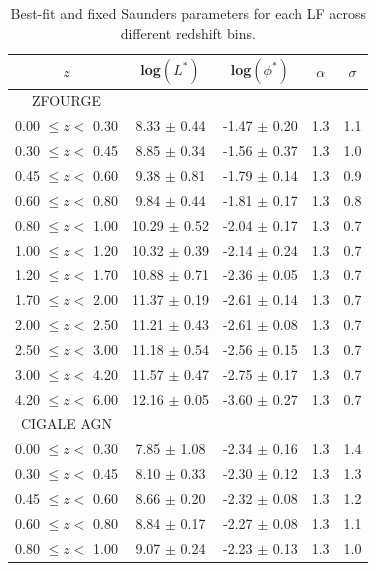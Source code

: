 \begin{table}[h]
    \caption{Best-fit and fixed Saunders parameters for each LF across different redshift bins.}
    \label{Tab: Param Evo}
    \begin{center}
    \begin{tabular}{ccccc}
        \toprule
        $z$ & log$(L^{*})$ & log$(\phi^{*})$ & $\alpha$ & $\sigma$ \\
        \hline
        ZFOURGE \\
        \hline
        0.00 $\leq z <$ 0.30 &  8.33 $\pm$ 0.44 & -1.47 $\pm$ 0.20 & 1.3 & 1.1 \\
        0.30 $\leq z <$ 0.45 &  8.85 $\pm$ 0.34 & -1.56 $\pm$ 0.37 & 1.3 & 1.0 \\
        0.45 $\leq z <$ 0.60 &  9.38 $\pm$ 0.81 & -1.79 $\pm$ 0.14 & 1.3 & 0.9 \\
        0.60 $\leq z <$ 0.80 &  9.84 $\pm$ 0.44 & -1.81 $\pm$ 0.17 & 1.3 & 0.8 \\
        0.80 $\leq z <$ 1.00 & 10.29 $\pm$ 0.52 & -2.04 $\pm$ 0.17 & 1.3 & 0.7 \\
        1.00 $\leq z <$ 1.20 & 10.32 $\pm$ 0.39 & -2.14 $\pm$ 0.24 & 1.3 & 0.7 \\
        1.20 $\leq z <$ 1.70 & 10.88 $\pm$ 0.71 & -2.36 $\pm$ 0.05 & 1.3 & 0.7 \\
        1.70 $\leq z <$ 2.00 & 11.37 $\pm$ 0.19 & -2.61 $\pm$ 0.14 & 1.3 & 0.7 \\
        2.00 $\leq z <$ 2.50 & 11.21 $\pm$ 0.43 & -2.61 $\pm$ 0.08 & 1.3 & 0.7 \\
        2.50 $\leq z <$ 3.00 & 11.18 $\pm$ 0.54 & -2.56 $\pm$ 0.15 & 1.3 & 0.7 \\
        3.00 $\leq z <$ 4.20 & 11.57 $\pm$ 0.47 & -2.75 $\pm$ 0.17 & 1.3 & 0.7 \\
        4.20 $\leq z <$ 6.00 & 12.16 $\pm$ 0.05 & -3.60 $\pm$ 0.27 & 1.3 & 0.7 \\     
        \hline 
        CIGALE AGN \\
        \hline 
        0.00 $\leq z <$ 0.30 &  7.85 $\pm$ 1.08 & -2.34 $\pm$ 0.16 & 1.3 & 1.4 \\
        0.30 $\leq z <$ 0.45 &  8.10 $\pm$ 0.33 & -2.30 $\pm$ 0.12 & 1.3 & 1.3 \\
        0.45 $\leq z <$ 0.60 &  8.66 $\pm$ 0.20 & -2.32 $\pm$ 0.08 & 1.3 & 1.2 \\
        0.60 $\leq z <$ 0.80 &  8.84 $\pm$ 0.17 & -2.27 $\pm$ 0.08 & 1.3 & 1.1 \\
        0.80 $\leq z <$ 1.00 &  9.07 $\pm$ 0.24 & -2.23 $\pm$ 0.13 & 1.3 & 1.0 \\

\end{tabular}
\end{center}
\end{table}
